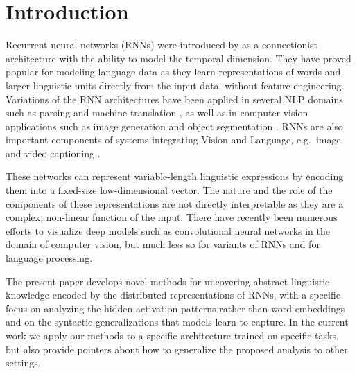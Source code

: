 \section{Introduction}
\label{sec:intro}
Recurrent neural networks (RNNs) were introduced by
as a connectionist architecture with the
ability to model the temporal dimension. They have proved popular for
modeling language data as they learn representations of words and
larger linguistic units directly from the input data, without feature
engineering. Variations of the RNN architectures have been applied in
several NLP domains such as parsing \cite{vinyals2015grammar} and
machine translation \cite{bahdanau2014neural}, as well as in computer
vision applications such as image generation \cite{gregor2015draw} and
object segmentation \cite{visin2015reseg}. RNNs are also important
components of systems integrating Vision and Language, e.g.\ image
\cite{karpathy2015deep} and video captioning \cite{yu2015video}.

These networks can represent variable-length linguistic expressions by
encoding them into a fixed-size low-dimensional vector. The nature and
the role of the components of these representations are not directly
interpretable as they are a complex, non-linear function of the
input. There have recently been numerous efforts to visualize deep
models such as convolutional neural networks in the domain of computer
vision, but much less so for variants of RNNs and for language
processing.
 
The present paper develops novel methods for uncovering abstract
linguistic knowledge encoded by the distributed representations of RNNs,
with a specific focus on analyzing the hidden activation patterns rather 
than word embeddings and on the syntactic generalizations 
that models learn to capture. In the current work we apply our methods
to a specific architecture trained on specific tasks, but also provide
pointers about how to generalize the proposed analysis to other settings.\label{generalintro}

